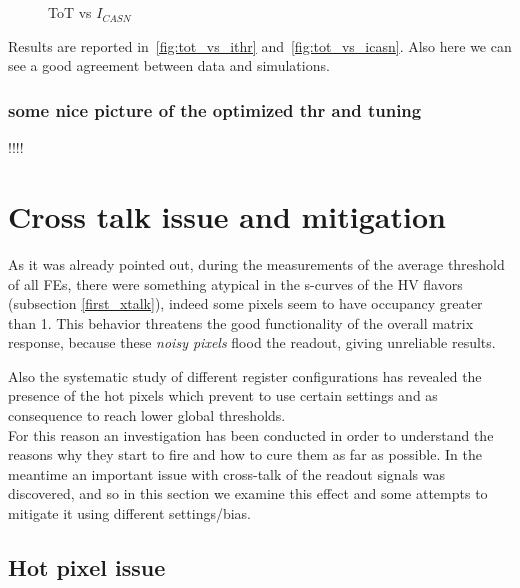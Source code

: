 \begin{figure}[h!]
\centering
{}\\%
{}\\
\caption{ToT vs $I_{CASN}$}
\label{fig:tot_vs_icasn}
\end{figure}

Results are reported in~\autoref{fig:tot_vs_ithr} and~\autoref{fig:tot_vs_icasn}. Also here we can see a good agreement between data and simulations.

\subsubsection{some nice picture of the optimized thr and tuning}

!!!!


\section{Cross talk issue and mitigation} \label{sec:xtalk}

As it was already pointed out, during the measurements of the average threshold of all FEs, there were something atypical in the s-curves of the HV flavors (subsection \vref{first_xtalk}), indeed some pixels seem to have occupancy greater than 1. This behavior threatens the good functionality of the overall matrix response, because these \textit{noisy pixels} flood the readout, giving unreliable results.

Also the systematic study of different register configurations has revealed the presence of the hot pixels which prevent to use certain settings and as consequence to reach lower global thresholds. \\

For this reason an investigation has been conducted in order to understand the reasons why they start to fire and how to cure them as far as possible.
In the meantime an important issue with cross-talk of the readout signals was discovered, and so in this section we examine this effect and some attempts to mitigate it using different settings/bias.


\subsection{Hot pixel issue}

